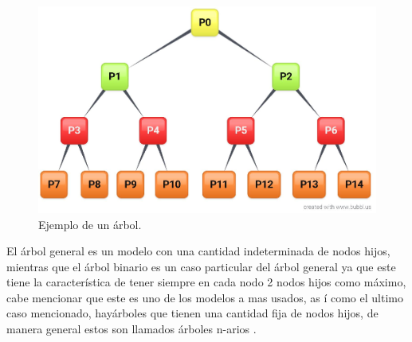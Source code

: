 \begin{figure}[h]
\centering
\includegraphics[width=0.8\columnwidth]{chap3/Imagenes/Arbol.eps}
\caption{Ejemplo de un \'arbol.}
\label{fig:iarbol}
\end{figure}

El \'arbol general es un modelo con una cantidad indeterminada de nodos hijos,
 mientras que el \'arbol binario es un caso particular del \'arbol general ya 
 que este tiene la caracter\'istica de tener siempre en cada nodo 2 nodos hijos 
 como m\'aximo, cabe mencionar que este es uno de los modelos a mas usados, as
 \'i como el ultimo caso mencionado, hay\'arboles que tienen una cantidad fija 
 de nodos hijos, de manera general estos son llamados \'arboles n-arios
 \cite{gutierrez1999estructuras}.